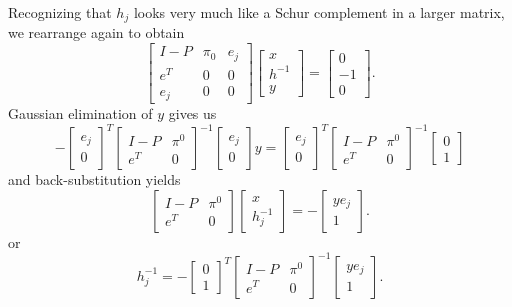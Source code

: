 \documentclass[12pt, leqno]{article} %
\begin{document}
Recognizing that $h_j$ looks very much like a Schur complement in a
larger matrix, we rearrange again to obtain
\[
  \begin{bmatrix}
    I-P & \pi_0 & e_j \\
    e^T & 0     & 0   \\
    e_j & 0     & 0
  \end{bmatrix}
  \begin{bmatrix} x \\ h^{-1} \\ y \end{bmatrix} =
  \begin{bmatrix} 0 \\ -1 \\ 0 \end{bmatrix}.
\]
Gaussian elimination of $y$ gives us
\[
 -\begin{bmatrix} e_j \\ 0 \end{bmatrix}^T
  \begin{bmatrix} I-P & \pi^0 \\ e^T & 0 \end{bmatrix}^{-1}
  \begin{bmatrix} e_j \\ 0 \end{bmatrix} y
  =
  \begin{bmatrix} e_j \\ 0 \end{bmatrix}^T
  \begin{bmatrix} I-P & \pi^0 \\ e^T & 0 \end{bmatrix}^{-1}
  \begin{bmatrix} 0 \\ 1 \end{bmatrix}
\]
and back-substitution yields
\[
  \begin{bmatrix} I-P & \pi^0 \\ e^T & 0 \end{bmatrix}
  \begin{bmatrix} x \\ h_j^{-1} \end{bmatrix} =
  -\begin{bmatrix} y e_j \\ 1 \end{bmatrix}.
\]
or
\[
  h_j^{-1} = -
  \begin{bmatrix} 0 \\ 1 \end{bmatrix}^T
  \begin{bmatrix} I-P & \pi^0 \\ e^T & 0 \end{bmatrix}^{-1}
  \begin{bmatrix} y e_j \\ 1 \end{bmatrix}.
\]
\end{document}
